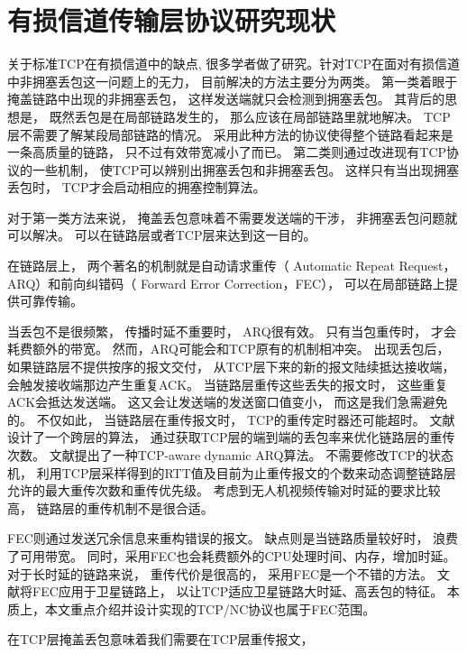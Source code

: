 \section{有损信道传输层协议研究现状}
\par
关于标准TCP在有损信道中的缺点,
很多学者做了研究\textsuperscript{\cite{Balakrishnan1997,ontcp,YE2005,tcpsatelite,OpenIssues}}。针对TCP在面对有损信道中非拥塞丢包这一问题上的无力，
目前解决的方法主要分为两类。
第一类着眼于掩盖链路中出现的非拥塞丢包，
这样发送端就只会检测到拥塞丢包。
其背后的思想是，
既然丢包是在局部链路发生的， 
那么应该在局部链路里就地解决。
TCP层不需要了解某段局部链路的情况。
采用此种方法的协议使得整个链路看起来是一条高质量的链路，
只不过有效带宽减小了而已。
第二类则通过改进现有TCP协议的一些机制，
使TCP可以辨别出拥塞丢包和非拥塞丢包。
这样只有当出现拥塞丢包时，
TCP才会启动相应的拥塞控制算法。
\par
对于第一类方法来说，
掩盖丢包意味着不需要发送端的干涉，
非拥塞丢包问题就可以解决。
可以在链路层或者TCP层来达到这一目的。
\par
在链路层上，
两个著名的机制就是自动请求重传（ Automatic Repeat Request，ARQ）和前向纠错码（ Forward Error Correction，FEC），
可以在局部链路上提供可靠传输\textsuperscript{\cite{1607897,1599400,1603715}}。
\par
当丢包不是很频繁，
传播时延不重要时，
ARQ很有效。
只有当包重传时，
才会耗费额外的带宽。
然而，ARQ可能会和TCP原有的机制相冲突\textsuperscript{\cite{Balakrishnan1997}}。
出现丢包后，
如果链路层不提供按序的报文交付，
从TCP层下来的新的报文陆续抵达接收端，
会触发接收端那边产生重复ACK。
当链路层重传这些丢失的报文时，
这些重复ACK会抵达发送端。
这又会让发送端的发送窗口值变小，
而这是我们急需避免的。
不仅如此，
当链路层在重传报文时，
TCP的重传定时器还可能超时。
文献\cite{Vacirca2003On}设计了一个跨层的算法，
通过获取TCP层的端到端的丢包率来优化链路层的重传次数。
文献\cite{crosslayer}提出了一种TCP-aware dynamic ARQ算法。
不需要修改TCP的状态机，
利用TCP层采样得到的RTT值及目前为止重传报文的个数来动态调整链路层允许的最大重传次数和重传优先级。
考虑到无人机视频传输对时延的要求比较高，
链路层的重传机制不是很合适。
\par
FEC则通过发送冗余信息来重构错误的报文。
缺点则是当链路质量较好时，
浪费了可用带宽。
同时，采用FEC也会耗费额外的CPU处理时间、内存，增加时延。
对于长时延的链路来说，
重传代价是很高的，
采用FEC是一个不错的方法。
文献\cite{Allman1999Enhancing}将FEC应用于卫星链路上，
以让TCP适应卫星链路大时延、高丢包的特征。
本质上，本文重点介绍并设计实现的TCP/NC协议也属于FEC范围。
\par
在TCP层掩盖丢包意味着我们需要在TCP层重传报文，
